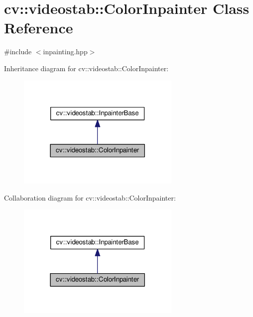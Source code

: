 \hypertarget{classcv_1_1videostab_1_1ColorInpainter}{\section{cv\-:\-:videostab\-:\-:Color\-Inpainter Class Reference}
\label{classcv_1_1videostab_1_1ColorInpainter}
}


{\ttfamily \#include $<$inpainting.\-hpp$>$}



Inheritance diagram for cv\-:\-:videostab\-:\-:Color\-Inpainter\-:\nopagebreak
\begin{figure}[H]
\begin{center}
\leavevmode
\includegraphics[width=222pt]{classcv_1_1videostab_1_1ColorInpainter__inherit__graph}
\end{center}
\end{figure}


Collaboration diagram for cv\-:\-:videostab\-:\-:Color\-Inpainter\-:\nopagebreak
\begin{figure}[H]
\begin{center}
\leavevmode
\includegraphics[width=222pt]{classcv_1_1videostab_1_1ColorInpainter__coll__graph}
\end{center}
\end{figure}
